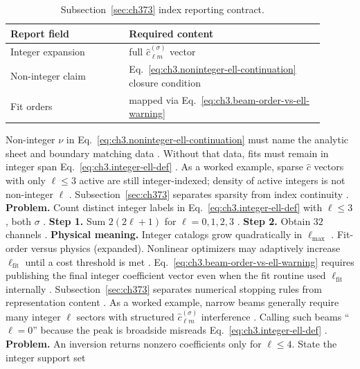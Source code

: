 \begin{table}[t]
\centering
\caption{Subsection~\ref{sec:ch373} index reporting contract.}
\label{tab:ch3.373-reporting-contract}
\small
\begin{tabular}{@{}p{0.34\linewidth}p{0.56\linewidth}@{}}
\toprule
Report field & Required content \\
\midrule
Integer expansion & full \(\widehat{c}_{\ell m}^{(\sigma)}\) vector \\
Non-integer claim & Eq.~\eqref{eq:ch3.noninteger-ell-continuation} closure condition \\
Fit orders & mapped via Eq.~\eqref{eq:ch3.beam-order-vs-ell-warning} \\
\bottomrule
\end{tabular}
\end{table}
Non-integer \(\nu\) in Eq.~\eqref{eq:ch3.noninteger-ell-continuation} must name the analytic sheet and boundary matching
data \cite{stratton1941}. Without that data, fits must remain in integer span
Eq.~\eqref{eq:ch3.integer-ell-def} \cite{hansen1988}.
As a worked example, sparse \(\widehat{c}\) vectors with only \(\ell\le3\) active are still integer-indexed; density of active integers is not
non-integer \(\ell\) \cite{harrington2001}. Subsection~\ref{sec:ch373} separates sparsity from index continuity
\cite{hansen1988}.
\textbf{Problem.} Count distinct integer labels in Eq.~\eqref{eq:ch3.integer-ell-def} with \(\ell\le3\), both \(\sigma\)
\cite{hansen1988}.
\textbf{Step 1.} Sum \(2(2\ell+1)\) for \(\ell=0,1,2,3\) \cite{jackson1999}.
\textbf{Step 2.} Obtain \(32\) channels \cite{hansen1988}.
\textbf{Physical meaning.} Integer catalogs grow quadratically in \(\ell_{\max}\) \cite{harrington2001}.
Fit-order versus physics (expanded). Nonlinear optimizers may adaptively increase \(\ell_{\mathrm{fit}}\) until a cost threshold is met \cite{harrington2001}.
Eq.~\eqref{eq:ch3.beam-order-vs-ell-warning} requires publishing the final integer coefficient vector even when the fit routine
used \(\ell_{\mathrm{fit}}\) internally \cite{stratton1941}. Subsection~\ref{sec:ch373} separates numerical stopping
rules from representation content \cite{harrington2001}.
As a worked example, narrow beams generally require many integer \(\ell\) sectors with structured \(\widehat{c}_{\ell m}^{(\sigma)}\) interference
\cite{hansen1988}. Calling such beams ``\(\ell=0\)'' because the peak is broadside misreads
Eq.~\eqref{eq:ch3.integer-ell-def} \cite{stratton1941}.
\textbf{Problem.} An inversion returns nonzero coefficients only for \(\ell\le4\). State the integer support set

